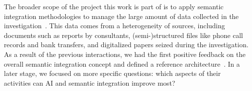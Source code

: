 

The broader scope of the project this work is part of is to apply semantic integration methodologies to manage the large amount of data collected in the investigation~\cite{real_batini2021semantic}. This data comes from a heterogeneity of sources, including documents such as reports by consultants, (semi-)structured files like phone call records and bank transfers, and digitalized papers seized during the investigation. As a result of the previous interactions, we had the first positive feedback on the overall semantic integration concept and defined a reference architecture~\cite{real_batini2021semantic}. In a later stage,  
we focused on more specific questions:
which aspects of their activities can AI and semantic integration improve most?

